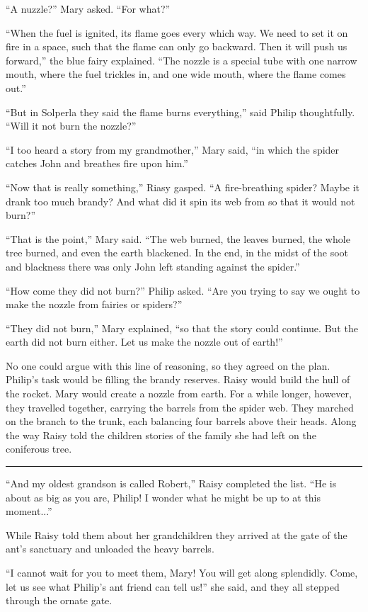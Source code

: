 \documentclass[10pt, draft]{memoir}
\renewcommand{\pfbreakdisplay}{\bigskip \ding{166} \bigskip}
\newcommand{\secbreak}{\fancybreak{\pfbreakdisplay}}
\begin{document}
``A nuzzle?'' Mary asked. ``For what?''

``When the fuel is ignited, its flame goes every which way. We need to set it on fire in a space, such that the flame can only go backward. Then it will push us forward,'' the blue fairy explained. ``The nozzle is a special tube with one narrow mouth, where the fuel trickles in, and one wide mouth, where the flame comes out.''

``But in Solperla they said the flame burns everything,'' said Philip thoughtfully. ``Will it not burn the nozzle?''

``I too heard a story from my grandmother,'' Mary said, ``in which the spider catches John and breathes fire upon him.''

``Now that is really something,'' Riasy gasped. ``A fire-breathing spider? Maybe it drank too much brandy? And what did it spin its web from so that it would not burn?''

``That is the point,'' Mary said. ``The web burned, the leaves burned, the whole tree burned, and even the earth blackened. In the end, in the midst of the soot and blackness there was only John left standing against the spider.''

``How come they did not burn?'' Philip asked. ``Are you trying to say we ought to make the nozzle from fairies or spiders?''

``They did not burn,'' Mary explained, ``so that the story could continue. But the earth did not burn either. Let us make the nozzle out of earth!''

No one could argue with this line of reasoning, so they agreed on the plan. Philip's task would be filling the brandy reserves. Raisy would build the hull of the rocket. Mary would create a nozzle from earth. For a while longer, however, they travelled together, carrying the barrels from the spider web. They marched on the branch to the trunk, each balancing four barrels above their heads. Along the way Raisy told the children stories of the family she had left on the coniferous tree.

\secbreak

``And my oldest grandson is called Robert,'' Raisy completed the list. ``He is about as big as you are, Philip! I wonder what he might be up to at this moment...''

While Raisy told them about her grandchildren they arrived at the gate of the ant's sanctuary and unloaded the heavy barrels.

``I cannot wait for you to meet them, Mary! You will get along splendidly. Come, let us see what Philip's ant friend can tell us!'' she said, and they all stepped through the ornate gate.
\end{document}
